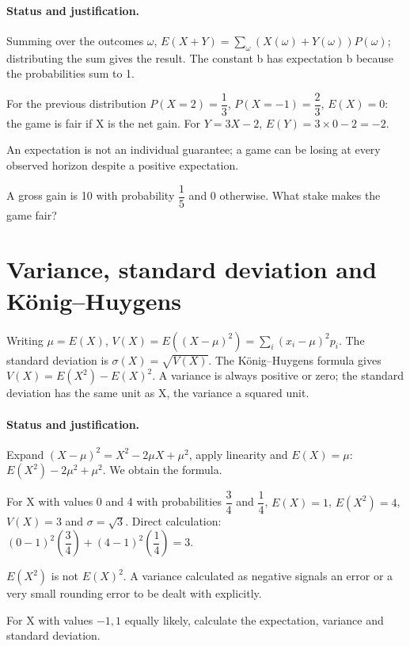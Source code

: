 \paragraph{Status and justification.} Summing over the outcomes $\omega$, $E(X+Y)=\sum_\omega(X(\omega)+Y(\omega))P(\omega)$; distributing the sum gives the result. The constant b has expectation b because the probabilities sum to 1.
\begin{example}For the previous distribution $P(X=2)=\dfrac{1}{3}$, $P(X=-1)=\dfrac{2}{3}$, $E(X)=0$: the game is fair if X is the net gain. For $Y=3X-2$, $E(Y)=3\times0-2=-2$.\end{example}\label{C08-EX2}
\begin{pitfall}An expectation is not an individual guarantee; a game can be losing at every observed horizon despite a positive expectation.\end{pitfall}
\begin{application}A gross gain is 10 with probability $\dfrac{1}{5}$ and 0 otherwise. What stake makes the game fair?\end{application}\label{C08-AP2}
\section{Variance, standard deviation and König--Huygens}\label{C08-U3}
\begin{keypoint}
Writing $\mu=E(X)$, $V(X)=E((X-\mu)^2)=\sum_i(x_i-\mu)^2p_i$. The standard deviation is $\sigma(X)=\sqrt{V(X)}$. The König--Huygens formula gives $V(X)=E(X^2)-E(X)^2$. A variance is always positive or zero; the standard deviation has the same unit as X, the variance a squared unit.
\end{keypoint}
\paragraph{Status and justification.} Expand $(X-\mu)^2=X^2-2\mu X+\mu^2$, apply linearity and $E(X)=\mu$: $E(X^2)-2\mu^2+\mu^2$. We obtain the formula.
\begin{example}For X with values 0 and 4 with probabilities $\dfrac{3}{4}$ and $\dfrac{1}{4}$, $E(X)=1$, $E(X^2)=4$, $V(X)=3$ and $\sigma=\sqrt3$. Direct calculation: $(0-1)^2(\dfrac{3}{4})+(4-1)^2(\dfrac{1}{4})=3$.\end{example}\label{C08-EX3}
\begin{pitfall}$E(X^2)$ is not $E(X)^2$. A variance calculated as negative signals an error or a very small rounding error to be dealt with explicitly.\end{pitfall}
\begin{application}For X with values $-1,1$ equally likely, calculate the expectation, variance and standard deviation.\end{application}\label{C08-AP3}
